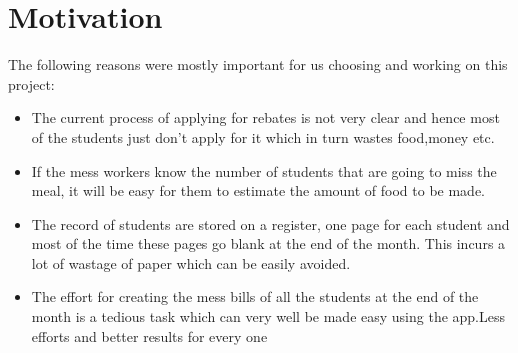 \newpage
\section{Motivation}
The following reasons were mostly important for us choosing and working on this project:
\begin{flushleft}
\begin{itemize}
    \item The current process of applying for rebates is not very clear and hence most of the students just don't apply for it which in turn wastes food,money etc.
    \item If the mess workers know the number of students that are going to miss the meal, it will be easy for them to estimate the amount of food to be made.
    \item The record of students are stored on a register, one page for each student and most of the time these pages go blank at the end of the month. This incurs a lot of wastage of paper which can be easily avoided.
    \item The effort for creating the mess bills of all the students at the end of the month is a tedious task which can very well be made easy using the app.Less efforts and better results for every one
\end{itemize}
\end{flushleft}
